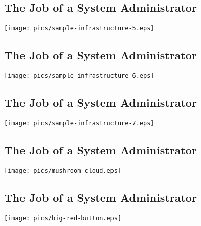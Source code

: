 \documentclass[xga]{xdvislides}
\begin{document}
\subsection{The Job of a System Administrator}
\vspace*{\fill}
\begin{center}
	\texttt{[image: pics/sample-infrastructure-5.eps]} \\
\end{center}
\vspace*{\fill}

\subsection{The Job of a System Administrator}
\vspace*{\fill}
\begin{center}
	\texttt{[image: pics/sample-infrastructure-6.eps]} \\
\end{center}
\vspace*{\fill}

\subsection{The Job of a System Administrator}
\vspace*{\fill} \begin{center}
\texttt{[image: pics/sample-infrastructure-7.eps]}
\\ \end{center} \vspace*{\fill}

\subsection{The Job of a System Administrator}
\vspace*{\fill}
\begin{center}
	\texttt{[image: pics/mushroom\_cloud.eps]} \\
\end{center}
\vspace*{\fill}



\subsection{The Job of a System Administrator}
\vspace*{\fill}
\begin{center}
	\texttt{[image: pics/big-red-button.eps]} \\
\end{center}
\vspace*{\fill}
\end{document}
